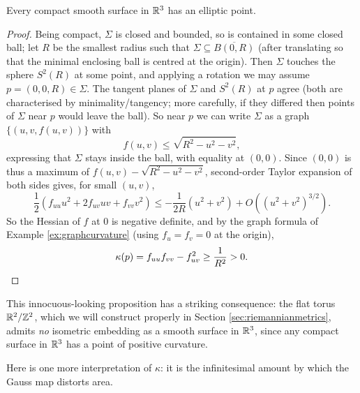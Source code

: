 \documentclass[a4paper]{scrartcl}
\begin{document}
\begin{proposition}\label{prop:ellipticpoint}
    Every compact smooth surface in $\mathbb{R}^3$ has an elliptic point.
\end{proposition}
\begin{proof}
    Being compact, $\Sigma$ is closed and bounded, so is contained in some closed ball; let $R$ be the smallest radius such that $\Sigma \subseteq \overline{B(0, R)}$ (after translating so that the minimal enclosing ball is centred at the origin). Then $\Sigma$ touches the sphere $S^2(R)$ at some point, and applying a rotation we may assume $p = (0, 0, R) \in \Sigma$. The tangent planes of $\Sigma$ and $S^2(R)$ at $p$ agree (both are characterised by minimality/tangency; more carefully, if they differed then points of $\Sigma$ near $p$ would leave the ball). So near $p$ we can write $\Sigma$ as a graph $\{(u, v, f(u,v))\}$ with
    $$
    f(u, v) \leq \sqrt{R^2 - u^2 - v^2},
    $$
    expressing that $\Sigma$ stays inside the ball, with equality at $(0,0)$. Since $(0,0)$ is thus a maximum of $f(u,v) - \sqrt{R^2 - u^2 - v^2}$, second-order Taylor expansion of both sides gives, for small $(u, v)$,
    $$
    \frac{1}{2}\left(f_{uu} u^2 + 2 f_{uv} uv + f_{vv} v^2 \right) \leq -\frac{1}{2R}(u^2 + v^2) + O((u^2+v^2)^{3/2}).
    $$
    So the Hessian of $f$ at $0$ is negative definite, and by the graph formula of Example \ref{ex:graphcurvature} (using $f_u = f_v = 0$ at the origin),
    $$
    \kappa(p) = f_{uu}f_{vv} - f_{uv}^2 \geq \frac{1}{R^2} > 0. \qedhere
    $$
\end{proof}

This innocuous-looking proposition has a striking consequence: the flat torus $\mathbb{R}^2/\mathbb{Z}^2$, which we will construct properly in Section \ref{sec:riemannianmetrics}, admits \emph{no} isometric embedding as a smooth surface in $\mathbb{R}^3$, since any compact surface in $\mathbb{R}^3$ has a point of positive curvature.

Here is one more interpretation of $\kappa$: it is the infinitesimal amount by which the Gauss map distorts area.
\end{document}
